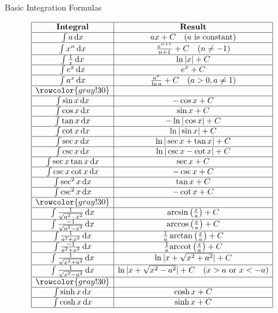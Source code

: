 \documentclass[11pt]{../../TexTemplate/elegantbook}
\begin{document}
\begin{leftbarTitle}{Basic Integration Formulas}\end{leftbarTitle}
\[
\begin{array}{|c|c|}
\hline
\textbf{Integral} & \textbf{Result} \\
\hline
\int a \, \mathrm{d}x & ax + C \quad (a \text{ is constant}) \\
\hline
\int x^n \, \mathrm{d}x & \frac{x^{n+1}}{n+1} + C \quad (n \neq -1) \\
\hline
\int \frac{1}{x} \, \mathrm{d}x & \ln|x| + C \\
\hline
\int e^x \, \mathrm{d}x & e^x + C \\
\hline
\int a^x \, \mathrm{d}x & \frac{a^x}{\ln a} + C \quad (a > 0, a \neq 1) \\ \hline
\rowcolor{gray!30} & \\ \hline
\int \sin x \, \mathrm{d}x & -\cos x + C \\ \hline
\int \cos x \, \mathrm{d}x & \sin x + C \\ \hline
\int \tan x \, \mathrm{d}x & -\ln|\cos x| + C \\ \hline
\int \cot x \, \mathrm{d}x & \ln|\sin x| + C \\ \hline
\int \sec x \, \mathrm{d}x & \ln|\sec x + \tan x| + C \\
\hline
\int \csc x \, \mathrm{d}x & \ln|\csc x - \cot x| + C \\
\hline
\int \sec x \tan x \, \mathrm{d}x & \sec x + C \\
\hline
\int \csc x \cot x \, \mathrm{d}x & -\csc x + C \\
\hline
\int \sec^2 x \, \mathrm{d}x & \tan x + C \\
\hline
\int \csc^2 x \, \mathrm{d}x & -\cot x + C \\ \hline
\rowcolor{gray!30} & \\ \hline
\int \frac{1}{\sqrt{a^{2}-x^2}} \, \mathrm{d}x & \arcsin \left( \frac{x}{a} \right) + C \\
\hline
\int \frac{-1}{\sqrt{a^{2}-x^2}} \, \mathrm{d}x & \arccos \left( \frac{x}{a} \right) + C \\
\hline
\int \frac{1}{a^{2}+x^2} \, \mathrm{d}x & \frac{1}{a}\arctan \left( \frac{x}{a} \right) + C \\
\hline
\int \frac{-1}{a^{2}+x^2} \, \mathrm{d}x &\frac{1}{a}\mathrm{arccot } \left( \frac{x}{a} \right) + C \\
\hline
\int \frac{1}{\sqrt{x^2+a^{2}}} \, \mathrm{d}x & \ln|x + \sqrt{x^2+a^{2}}| + C \\
\hline
\int \frac{1}{\sqrt{x^2-a^{2}}} \, \mathrm{d}x & \ln|x + \sqrt{x^2-a^{2}}| + C \quad (x > a \text{ or } x < -a) \\ \hline
\rowcolor{gray!30} & \\ \hline
\int \sinh x \, \mathrm{d}x & \cosh x + C \\
\hline
\int \cosh x \, \mathrm{d}x & \sinh x + C \\
\hline
\end{array}
\]
\end{document}
